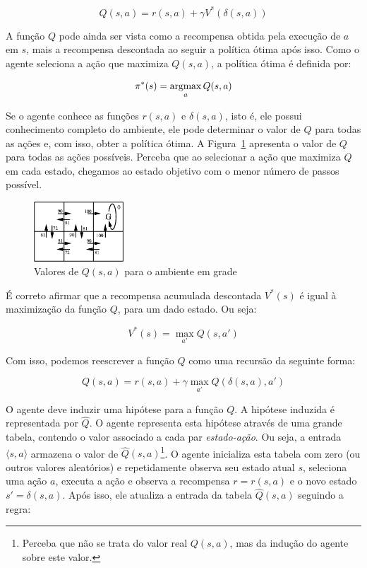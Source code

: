 $$
Q(s, a) = r(s, a) + \gamma V^* (\delta(s, a))
$$

A função $Q$ pode ainda ser vista como a recompensa obtida pela execução de $a$ em $s$, mais a recompensa descontada ao seguir a política ótima após isso. Como o agente seleciona a ação que maximiza $Q(s, a)$, a política ótima é definida por:

$$
\pi^*(s) = \mathop{\mathrm{argmax}}_{a} Q(s, a)
$$

Se o agente conhece as funções $r(s, a)$ e $\delta(s, a)$, isto é, ele possui conhecimento completo do ambiente, ele pode determinar o valor de $Q$ para todas as ações e, com isso, obter a política ótima. A Figura~\ref{fig:exemplo-rl-tabela-q} apresenta o valor de $Q$ para todas as ações possíveis. Perceba que ao selecionar a ação que maximiza $Q$ em cada estado, chegamos ao estado objetivo com o menor número de passos possível.

\begin{figure}[h]
	\centering
	\includegraphics[width=0.3\textwidth]{img/exemplo-rl-tabela-q}
	\caption{Valores de $Q(s, a)$ para o ambiente em grade}
	\label{fig:exemplo-rl-tabela-q}
\end{figure}

É correto afirmar que a recompensa acumulada descontada $V^*(s)$ é igual à maximização da função $Q$, para um dado estado. Ou seja:

$$
V^*(s) = \max_{a'} Q(s, a')
$$

Com isso, podemos reescrever a função $Q$ como uma recursão da seguinte forma:

$$
Q(s, a) = r(s, a) + \gamma \max_{a'} Q(\delta(s, a), a')
$$

O agente deve induzir uma hipótese para a função $Q$. A hipótese induzida é representada por $\widehat{Q}$. O agente representa esta hipótese através de uma grande tabela, contendo o valor associado a cada par \textit{estado-ação}. Ou seja, a entrada $\langle s, a \rangle$ armazena o valor de $\widehat{Q}(s, a)$\footnote{Perceba que não se trata do valor real $Q(s, a)$, mas da indução do agente sobre este valor.}. O agente inicializa esta tabela com zero (ou outros valores aleatórios) e repetidamente observa seu estado atual $s$, seleciona uma ação $a$, executa a ação e observa a recompensa $r = r(s, a)$ e o novo estado $s'= \delta(s, a)$. Após isso, ele atualiza a entrada da tabela $\widehat{Q}(s, a)$ seguindo a regra:

